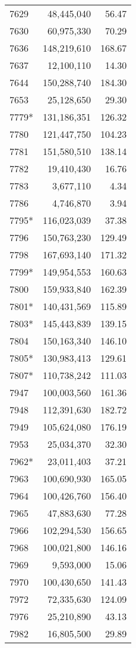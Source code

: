 \documentclass[11pt]{article}
\begin{document}
\begin{longtable}[!hbtp]{l r r}
7629	&	48,445,040	&	56.47	\\
7630	&	60,975,330	&	70.29	\\
7636	&	148,219,610	&	168.67	\\
7637	&	12,100,110	&	14.30	\\
7644	&	150,288,740	&	184.30	\\
7653	&	25,128,650	&	29.30	\\
7779*	&	131,186,351	&	126.32	\\
7780	&	121,447,750	&	104.23	\\
7781	&	151,580,510	&	138.14	\\
7782	&	19,410,430	&	16.76	\\
7783	&	3,677,110	&	4.34	\\
7786	&	4,746,870	&	3.94	\\
7795*	&	116,023,039	&	37.38	\\
7796	&	150,763,230	&	129.49	\\
7798	&	167,693,140	&	171.32	\\
7799*	&	149,954,553	&	160.63	\\
7800	&	159,933,840	&	162.39	\\
7801*	&	140,431,569	&	115.89	\\
7803*	&	145,443,839	&	139.15	\\
7804	&	150,163,340	&	146.10	\\
7805*	&	130,983,413	&	129.61	\\
7807*	&	110,738,242	&	111.03	\\
7947	&	100,003,560	&	161.36	\\
7948	&	112,391,630	&	182.72	\\
7949	&	105,624,080	&	176.19	\\
7953	&	25,034,370	&	32.30	\\
7962*	&	23,011,403	&	37.21	\\
7963	&	100,690,930	&	165.05	\\
7964	&	100,426,760	&	156.40	\\
7965	&	47,883,630	&	77.28	\\
7966	&	102,294,530	&	156.65	\\
7968	&	100,021,800	&	146.16	\\
7969	&	9,593,000	&	15.06	\\
7970	&	100,430,650	&	141.43	\\
7972	&	72,335,630	&	124.09	\\
7976	&	25,210,890	&	43.13	\\
7982	&	16,805,500	&	29.89	\\

\end{longtable}
\end{document}
